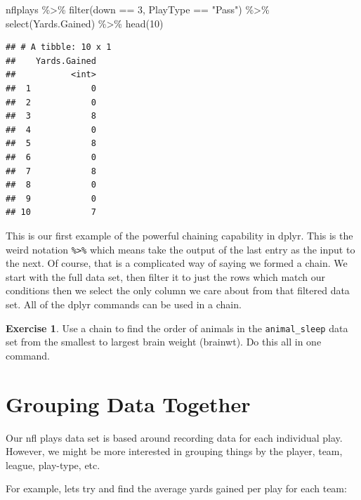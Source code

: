 \documentclass[
]{book}
\newenvironment{Shaded}{\begin{snugshade}}{\end{snugshade}}
\newcommand{\DecValTok}[1]{\textcolor[rgb]{0.00,0.00,0.81}{#1}}
\newcommand{\FunctionTok}[1]{\textcolor[rgb]{0.00,0.00,0.00}{#1}}
\newcommand{\NormalTok}[1]{#1}
\newcommand{\SpecialCharTok}[1]{\textcolor[rgb]{0.00,0.00,0.00}{#1}}
\newcommand{\StringTok}[1]{\textcolor[rgb]{0.31,0.60,0.02}{#1}}
\theoremstyle{definition}
\theoremstyle{definition}
\theoremstyle{definition}
\newtheorem{exercise}{Exercise}[chapter]
\theoremstyle{definition}
\theoremstyle{remark}
\begin{document}
\begin{Shaded}
\begin{Highlighting}[]
\NormalTok{nflplays }\SpecialCharTok{\%\textgreater{}\%}
    \FunctionTok{filter}\NormalTok{(down }\SpecialCharTok{==} \DecValTok{3}\NormalTok{, PlayType }\SpecialCharTok{==} \StringTok{"Pass"}\NormalTok{) }\SpecialCharTok{\%\textgreater{}\%}
    \FunctionTok{select}\NormalTok{(Yards.Gained) }\SpecialCharTok{\%\textgreater{}\%}
    \FunctionTok{head}\NormalTok{(}\DecValTok{10}\NormalTok{)}
\end{Highlighting}
\end{Shaded}

\begin{verbatim}
## # A tibble: 10 x 1
##    Yards.Gained
##           <int>
##  1            0
##  2            0
##  3            8
##  4            0
##  5            8
##  6            0
##  7            8
##  8            0
##  9            0
## 10            7
\end{verbatim}

This is our first example of the powerful chaining capability in dplyr. This is the weird notation \texttt{\%\textgreater{}\%} which means take the output of the last entry as the input to the next. Of course, that is a complicated way of saying we formed a chain. We start with the full data set, then filter it to just the rows which match our conditions then we select the only column we care about from that filtered data set. All of the dplyr commands can be used in a chain.

\begin{exercise}
\protect\hypertarget{exr:unnamed-chunk-159}{}\label{exr:unnamed-chunk-159}Use a chain to find the order of animals in the \texttt{animal\_sleep} data set from the smallest to largest brain weight (brainwt). Do this all in one command.
\end{exercise}

\hypertarget{grouping-data-together}{%
\section{Grouping Data Together}\label{grouping-data-together}}

Our nfl plays data set is based around recording data for each individual play. However, we might be more interested in grouping things by the player, team, league, play-type, etc.

For example, lets try and find the average yards gained per play for each team:
\end{document}
